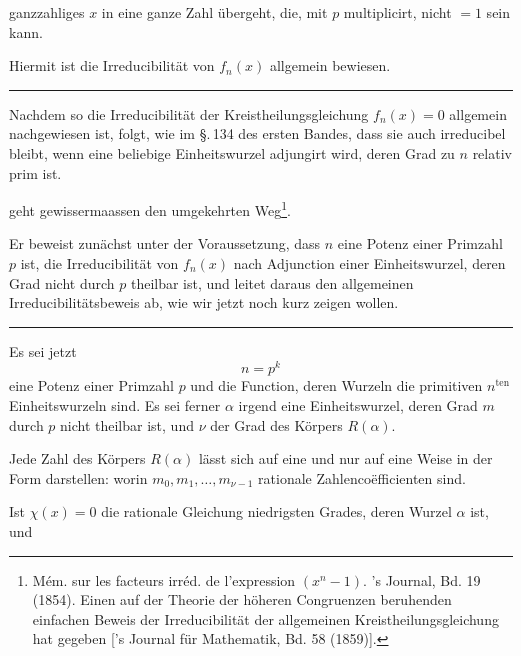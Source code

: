 
ganzzahliges $x$ in eine ganze Zahl übergeht, die, mit $p$ multiplicirt, nicht $= 1$ sein kann.

Hiermit ist die Irreducibilität von $f_n(x)$ allgemein bewiesen.

\begin{center}
\rule{4cm}{0.4pt}
\end{center}

Nachdem so die Irreducibilität der Kreistheilungsgleichung
$f_n(x) = 0$ allgemein nachgewiesen ist, folgt, wie im \S.\,134 des
ersten Bandes, dass sie auch irreducibel bleibt, wenn eine beliebige Einheitswurzel adjungirt wird, deren Grad zu $n$ relativ
prim ist.

 geht gewissermaassen den umgekehrten Weg\footnote{Mém. sur les facteurs irréd. de l'expression $(x^n-1)$. 's
Journal, Bd. 19 (1854). Einen auf der Theorie der höheren Congruenzen
beruhenden einfachen Beweis der Irreducibilität der allgemeinen Kreistheilungsgleichung hat  gegeben ['s Journal für Mathematik, Bd. 58 (1859)].}.

Er beweist zunächst unter der Voraussetzung, dass $n$ eine
Potenz einer Primzahl $p$ ist, die Irreducibilität von $f_n(x)$ nach
Adjunction einer Einheitswurzel, deren Grad nicht durch $p$
theilbar ist, und leitet daraus den allgemeinen Irreducibilitätsbeweis ab, wie wir jetzt noch kurz zeigen wollen.

\begin{center}
\rule{4cm}{0.4pt}
\end{center}

Es sei jetzt
\[
n = p^k
\]
eine Potenz einer Primzahl $p$ und
die Function, deren Wurzeln die primitiven $n^{\mathrm{ten}}$ Einheitswurzeln
sind. Es sei ferner $\alpha$ irgend eine Einheitswurzel, deren Grad $m$
durch $p$ nicht theilbar ist, und $\nu$ der Grad des Körpers $R(\alpha)$.

Jede Zahl des Körpers $R(\alpha)$ lässt sich auf eine und nur
auf eine Weise in der Form darstellen:
worin $m_0, m_1, \dots, m_{\nu-1}$ rationale Zahlencoëfficienten sind.

Ist $\chi(x) = 0$ die rationale Gleichung niedrigsten Grades,
deren Wurzel $\alpha$ ist, und

